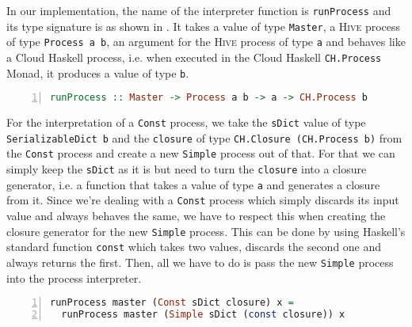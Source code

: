 In our implementation, the name of the interpreter function is \texttt{runProcess} and its type signature is as shown in . It takes a value of type \texttt{Master}, a \textsc{Hive} process of type \texttt{Process a b}, an argument for the \textsc{Hive} process of type \texttt{a} and behaves like a \textsf{Cloud Haskell} process, i.e. when executed in the \textsf{Cloud Haskell} \texttt{CH.Process} Monad, it produces a value of type \texttt{b}.
\begin{lstlisting}[language=Haskell,caption=Signature of the process interpreter.,label=lst:interpreter_signature,numbers=left,frame=bt]
runProcess :: Master -> Process a b -> a -> CH.Process b
\end{lstlisting}

For the interpretation of a \texttt{Const} process, we take the \texttt{sDict} value of type \texttt{SerializableDict b} and the \texttt{closure} of type \texttt{CH.Closure (CH.Process b)} from the \texttt{Const} process and create a new \texttt{Simple} process out of that. For that we can simply keep the \texttt{sDict} as it is but need to turn the \texttt{closure} into a closure generator, i.e. a function that takes a value of type \texttt{a} and generates a closure from it. Since we're dealing with a \texttt{Const} process which simply discards its input value and always behaves the same, we have to respect this when creating the closure generator for the new \texttt{Simple} process. This can be done by using Haskell's standard function \texttt{const} which takes two values, discards the second one and always returns the first. Then, all we have to do is pass the new \texttt{Simple} process into the process interpreter.
\begin{lstlisting}[language=Haskell,caption=Implementation of the interpreter of \texttt{Const} processes.,label=lst:runprocess_const,numbers=left,frame=bt]
runProcess master (Const sDict closure) x =
  runProcess master (Simple sDict (const closure)) x
\end{lstlisting}

